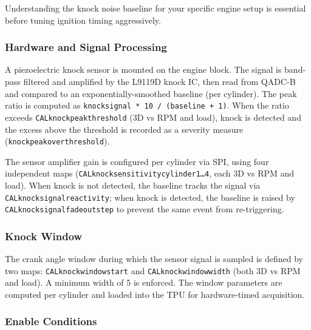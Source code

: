 \documentclass[a4paper,11pt]{article}
\renewcommand{\_}{\oldunderscore\allowbreak}
\begin{document}
Understanding the knock noise baseline for your specific engine setup is
essential before tuning ignition timing aggressively.

\subsubsection*{Hardware and Signal Processing}

A piezoelectric knock sensor is mounted on the engine block. The signal is
band-pass filtered and amplified by the L9119D knock IC, then read from
QADC-B and compared to an exponentially-smoothed baseline (per cylinder). The
peak ratio is computed as \texttt{knock\_signal * 10 / (baseline + 1)}.
When the ratio exceeds \texttt{CAL\_knock\_peak\_threshold} (3D vs RPM
and load), knock is detected and the excess above the threshold is recorded
as a severity measure (\texttt{knock\_peak\_over\_threshold}).

The sensor amplifier gain is configured per cylinder via SPI, using four
independent maps (\texttt{CAL\_knock\_sensitivity\_cylinder1\ldots4},
each 3D vs RPM and load). When knock is not detected, the baseline
tracks the signal via \texttt{CAL\_knock\_signal\_reactivity}; when knock is
detected, the baseline is raised by \texttt{CAL\_knock\_signal\_fadeout\_step}
to prevent the same event from re-triggering.

\subsubsection*{Knock Window}

The crank angle window during which the sensor signal is sampled is defined by
two maps: \texttt{CAL\_knock\_window\_start} and
\texttt{CAL\_knock\_window\_width} (both 3D vs RPM and load). A
minimum width of 5\textdegree{} is enforced. The window parameters are computed
per cylinder and loaded into the TPU for hardware-timed acquisition.

\subsubsection*{Enable Conditions}
\end{document}
